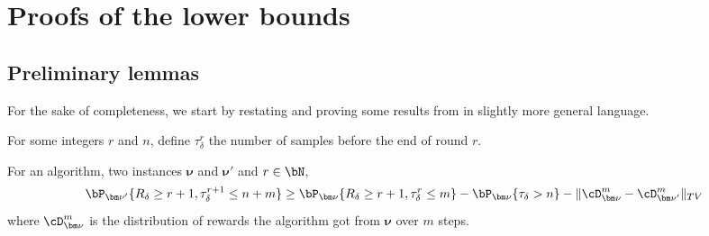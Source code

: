 
\section{Proofs of the lower bounds}\label{app:lb}
\subsection{Preliminary lemmas}

For the sake of completeness, we start by restating and proving some results from \citep{taoCollaborativeLearningLimited2019} in slightly more general language.
\begin{definition}
	For some integers $r$ and $n$, define $\tau_\delta^r$ the number of samples before the end of round $r$.
\end{definition}
\begin{lemma}\label{lem:27f}
	For an algorithm, two instances ${\bm\nu}$ and ${\bm\nu}'$ and $r\in\bN$, \[\bP_{{\bm\nu}'}\{R_\delta\geq r+1,\tau_\delta^{r+1} \leq n+m\}\geq \bP_{\bm\nu}\{R_\delta \geq r+1,\tau_\delta^r\leq m\}-\bP_{\bm\nu} \{\tau_\delta>n\} -\Vert\cD_{\bm\nu}^m -\cD_{{\bm\nu}'}^m\Vert_{TV}\] where $\cD^m_{\bm\nu}$ is the distribution of rewards the algorithm got from $\bm\nu$ over $m$ steps.
\end{lemma}

